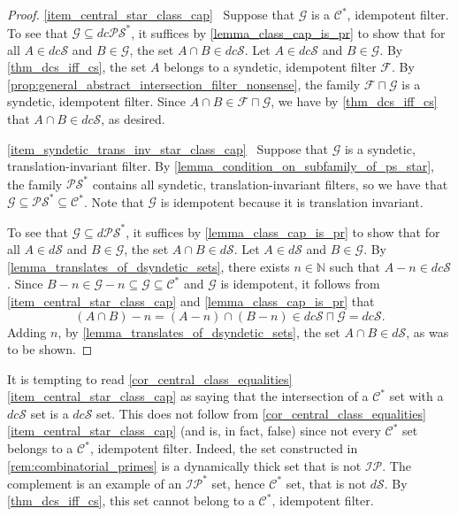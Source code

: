 \documentclass[letter,11pt]{article}
\theoremstyle{plain}
\theoremstyle{definition}
\theoremstyle{plain}
\theoremstyle{plain}
\numberwithin{equation}{section}
\newcommand{\N}{\mathbb{N}}
\newcommand{\dsyndetic}{d\mathcal{S}}
\newcommand{\dcsyndetic}{dc\mathcal{S}}
\newcommand{\PS}{\mathcal{PS}}
\newcommand{\dPS}{d\mathcal{PS}}
\newcommand{\dcPS}{dc\mathcal{PS}}
\newcommand{\central}{\mathcal{C}}
\newcommand{\IP}{\mathcal{IP}}
\newcommand{\filter}{\mathscr{F}}
\newcommand{\filtertwo}{\mathscr{G}}
\newcommand{\classcap}{\sqcap}
\begin{document}
\begin{proof}
    \eqref{item_central_star_class_cap} \ Suppose that $\filtertwo$ is a $\central^*$, idempotent filter. To see that $\filtertwo \subseteq \dcPS^*$, it suffices by \cref{lemma_class_cap_is_pr} to show that for all $A \in \dcsyndetic$ and $B \in \filtertwo$, the set $A \cap B \in \dcsyndetic$.  Let $A \in \dcsyndetic$ and $B \in \filtertwo$. By \cref{thm_dcs_iff_cs}, the set $A$ belongs to a syndetic, idempotent filter $\filter$.  By \cref{prop:general_abstract_intersection_filter_nonsense}, the family $\filter \classcap \filtertwo$ is a syndetic, idempotent filter.  Since $A \cap B \in \filter \classcap \filtertwo$, we have by \cref{thm_dcs_iff_cs} that $A \cap B \in \dcsyndetic$, as desired.

    

    \eqref{item_syndetic_trans_inv_star_class_cap} \ Suppose that $\filtertwo$ is a syndetic, translation-invariant filter. By \cref{lemma_condition_on_subfamily_of_ps_star}, the family $\PS^*$ contains all syndetic, translation-invariant filters, so we have that $\filtertwo \subseteq \PS^* \subseteq \central^*$.  Note that $\filtertwo$ is idempotent because it is translation invariant.
   

    To see that $\filtertwo \subseteq \dPS^*$, it suffices by \cref{lemma_class_cap_is_pr} to show that for all $A \in \dsyndetic$ and $B \in \filtertwo$, the set $A \cap B \in \dsyndetic$.  Let $A \in \dsyndetic$ and $B \in \filtertwo$. By \cref{lemma_translates_of_dsyndetic_sets}, there exists $n \in \N$ such that $A - n \in \dcsyndetic$. Since $B - n \in \filtertwo - n \subseteq \filtertwo \subseteq \central^*$ and $\filtertwo$ is idempotent, it follows from \eqref{item_central_star_class_cap} and \cref{lemma_class_cap_is_pr} that
    \[
        (A \cap B) - n = (A - n) \cap (B - n) \in \dcsyndetic \classcap \filtertwo = \dcsyndetic.
    \]
    Adding $n$, by \cref{lemma_translates_of_dsyndetic_sets}, the set $A \cap B \in \dsyndetic$, as was to be shown.
\end{proof}


It is tempting to read \cref{cor_central_class_equalities} \eqref{item_central_star_class_cap} as saying that the intersection of a $\central^*$ set with a $\dcsyndetic$ set is a $\dcsyndetic$ set.  This does not follow from \cref{cor_central_class_equalities} \eqref{item_central_star_class_cap} (and is, in fact, false) since not every $\central^*$ set belongs to a $\central^*$, idempotent filter.  Indeed, the set constructed in \cref{rem:combinatorial_primes} is a dynamically thick set that is not $\IP$.  The complement is an example of an $\IP^*$ set, hence $\central^*$ set, that is not $\dsyndetic$.  By \cref{thm_dcs_iff_cs}, this set cannot belong to a $\central^*$, idempotent filter.
\end{document}
